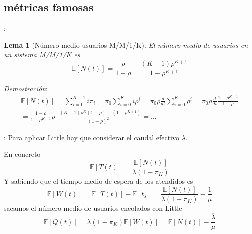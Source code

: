 \documentclass[xcolor={x11names}]{beamer}
\newtheorem{lema}{Lema}[section]
\begin{document}
\subsection{métricas famosas}
\begin{frame}{\secname: \subsecname}
    \begin{lema}[Número medio usuarios M/M/1/K]
        El número medio de usuarios en un
        sistema M/M/1/K es
        \begin{equation}
            \mathbb{E}[N(t)]=
            \frac{\rho}{1-\rho}-
            \frac{(K+1)\rho^{K+1}}{1-\rho^{K+1}}
        \end{equation}
    \end{lema}

    \vfill

    \textit{Demostración}:
    \begin{multline*}
        \mathbb{E}[N(t)]=
        \sum_{i=0}^{K+1}i \pi_i
        =\pi_0\sum_{i=0}^K i\rho^i
        =\pi_0\rho\frac{d}{dt}
        \sum_{i=0}^K\rho^i
        = \pi_0\rho \frac{d}{dt}
        \frac{1-\rho^{K+1}}{1-\rho}\\
        =\frac{1-\rho}{1-\rho^{K+1}}\rho
        \frac{-(K+1)\rho^K(1-\rho)+(1-\rho^{K+1})}{(1-\rho)^2}=\ldots
    \end{multline*}
\end{frame}



\begin{frame}{\secname: \subsecname}
    Para aplicar Little hay que considerar
    el caudal efectivo $\overline{\lambda}$.
    \begin{figure}
        \resizebox{!}{.15\textwidth}{%
            
        }
    \end{figure}
    En concreto
    \begin{equation*}
        \mathbb{E}[T(t)]=
        \frac{\mathbb{E}[N(t)]}{\lambda(1-\pi_K)}
    \end{equation*}
    Y sabiendo que el tiempo medio de
    espera de los atendidos es
    \begin{equation*}
        \mathbb{E}[W(t)]=
        \mathbb{E}[T(t)]-\mathbb{E}[t_s]
        =\frac{\mathbb{E}[N(t)]}{\lambda(1-\pi_K)}
        - \frac{1}{\mu}
    \end{equation*}
    sacamos el número medio de usuarios
    encolados con Little
    \begin{equation*}
        \mathbb{E}[Q(t)]=
        \lambda(1-\pi_K)
        \mathbb{E}[W(t)]=
        \mathbb{E}[N(t)]-
        \frac{\overline{\lambda}}{\mu}
    \end{equation*}
\end{frame}
\end{document}

